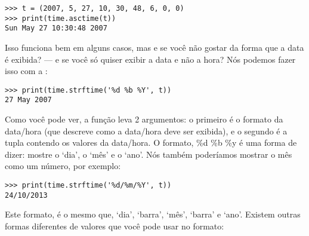 \begin{listing}
\begin{verbatim}
>>> t = (2007, 5, 27, 10, 30, 48, 6, 0, 0)
>>> print(time.asctime(t))
Sun May 27 10:30:48 2007
\end{verbatim}
\end{listing}

\noindent
Isso funciona bem em alguns casos, mas e se você não gostar da forma que a data é exibida? --- e se você só quiser exibir a data e não a hora? Nós podemos fazer isso com a :

\begin{listing}
\begin{verbatim}
>>> print(time.strftime('%d %b %Y', t))
27 May 2007
\end{verbatim}
\end{listing}

Como você pode ver, a função  leva 2 argumentos: o primeiro é o formato da data/hora (que descreve como a data/hora deve ser exibida), e o segundo é a tupla contendo os valores da data/hora. O formato, \%d \%b \%y é uma forma de dizer: mostre o `dia', o `mês' e o `ano'. Nós também poderíamos mostrar o mês como um número, por exemplo:

\begin{listing}
\begin{verbatim}
>>> print(time.strftime('%d/%m/%Y', t))
24/10/2013
\end{verbatim}
\end{listing}

Este formato, é o mesmo que, `dia', `barra', `mês', `barra' e `ano'. Existem outras formas diferentes de valores que você pode usar no formato:

